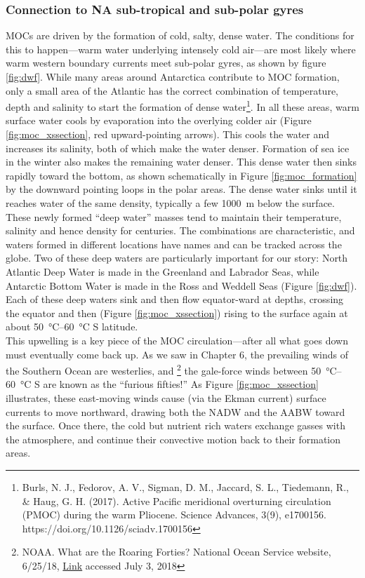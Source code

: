 {\subsubsection{Connection to NA sub-tropical and sub-polar gyres}
MOCs are driven by the formation of cold, salty, dense water. The conditions for this to happen---warm water underlying intensely cold air---are most likely where warm western boundary currents meet sub-polar gyres, as shown by figure \ref{fig:dwf}. While many areas around Antarctica contribute to MOC formation, only a small area of the Atlantic has the correct combination of temperature, depth and salinity to start the formation of dense water\footnote{Burls, N. J., Fedorov, A. V., Sigman, D. M., Jaccard, S. L., Tiedemann, R., \& Haug, G. H. (2017). Active Pacific meridional overturning circulation (PMOC) during the warm Pliocene. Science Advances, 3(9), e1700156. https://doi.org/10.1126/sciadv.1700156}. In all these areas, warm surface water cools by evaporation into the overlying colder air (Figure \ref{fig:moc_xssection}, red upward-pointing arrows). This cools the water and increases its salinity, both of which make the water denser. Formation of sea ice in the winter also makes the remaining water denser. This dense water then sinks rapidly toward the bottom, as shown schematically in Figure \ref{fig:moc_formation} by the downward pointing loops in the polar areas. The dense water sinks until it reaches water of the same density, typically a few \SI{1000}{\metre} below the surface. These newly formed ``deep water'' masses tend to maintain their temperature, salinity and hence density for centuries. The combinations are characteristic, and waters formed in different locations have names and can be tracked across the globe. Two of these deep waters are particularly important for our story: North Atlantic Deep Water is made in the Greenland and Labrador Seas, while Antarctic Bottom Water is made in the Ross and Weddell Seas (Figure \ref{fig:dwf}). Each of these deep waters sink and then flow equator-ward at depths, crossing the equator and then (Figure \ref{fig:moc_xssection}) rising to the surface again at about \SIrange{50}{60}{\celsius} S latitude.\\
This upwelling is a key piece of the MOC circulation---after all what goes down must eventually come back up. As we saw in Chapter 6, the prevailing winds of the Southern Ocean are westerlies, and \footnote{NOAA. What are the Roaring Forties? National Ocean Service website, 6/25/18,  \href{https://oceanservice.noaa.gov/facts/roaring-forties.html}{Link} accessed July 3, 2018} the gale-force winds between \SIrange{50}{60}{\celsius} S are known as the ``furious fifties!'' As Figure \ref{fig:moc_xssection} illustrates, these east-moving winds cause (via the Ekman current) surface currents to move northward, drawing both the NADW and the AABW toward the surface. Once there, the cold but nutrient rich waters exchange gasses with the atmosphere, and continue their convective motion back to their formation areas. \\

}
